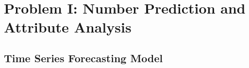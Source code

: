 \documentclass[12pt]{article}
\begin{document}



\section{Problem I: Number Prediction and Attribute Analysis }

\subsection{Time Series Forecasting Model}
\end{document}
